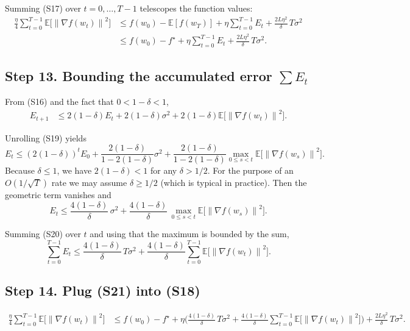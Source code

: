 \documentclass{article}
\newcommand{\E}{\mathbb{E}}
\newcommand{\norm}[1]{\left\|#1\right\|}
\begin{document}
Summing (S17) over $t=0,\dots,T-1$ telescopes the function values:
\[
\begin{aligned}
\frac{\eta}{4}\sum_{t=0}^{T-1}\E\!\big[\norm{\nabla f(w_t)}^{2}\big]
&\le f(w_0)-\E[f(w_T)]
   +\eta\sum_{t=0}^{T-1}E_t
   +\frac{2L\eta^{2}}{\delta}\,T\sigma^{2}\\[1mm]
&\le f(w_0)-f^\star
   +\eta\sum_{t=0}^{T-1}E_t
   +\frac{2L\eta^{2}}{\delta}\,T\sigma^{2}.
\end{aligned}
\tag{S18}
\]

\subsection*{Step 13. Bounding the accumulated error $\sum E_t$}
From (S16) and the fact that $0<1-\delta<1$,
\[
\begin{aligned}
E_{t+1}
&\le 2(1-\delta)E_t + 2(1-\delta)\sigma^{2}
   +2(1-\delta)\E\!\big[\norm{\nabla f(w_t)}^{2}\big] .
\end{aligned}
\tag{S19}
\]

Unrolling (S19) yields
\[
E_t\le (2(1-\delta))^{t}E_0
      +\frac{2(1-\delta)}{1-2(1-\delta)}\sigma^{2}
      +\frac{2(1-\delta)}{1-2(1-\delta)}
        \max_{0\le s<t}\E\!\big[\norm{\nabla f(w_s)}^{2}\big].
\]
Because $\delta\le1$, we have $2(1-\delta)<1$ for any $\delta>1/2$.
For the purpose of an $O(1/\sqrt{T})$ rate we may assume $\delta\ge 1/2$
(which is typical in practice). Then the geometric term vanishes and
\[
E_t\le \frac{4(1-\delta)}{\delta}\,\sigma^{2}
      +\frac{4(1-\delta)}{\delta}\,
        \max_{0\le s<t}\E\!\big[\norm{\nabla f(w_s)}^{2}\big].
\tag{S20}
\]

Summing (S20) over $t$ and using that the maximum is bounded by the sum,
\[
\sum_{t=0}^{T-1}E_t
\le \frac{4(1-\delta)}{\delta}\,T\sigma^{2}
   +\frac{4(1-\delta)}{\delta}
     \sum_{t=0}^{T-1}\E\!\big[\norm{\nabla f(w_t)}^{2}\big].
\tag{S21}
\]

\subsection*{Step 14. Plug (S21) into (S18)}
\[
\begin{aligned}
\frac{\eta}{4}\sum_{t=0}^{T-1}\E\!\big[\norm{\nabla f(w_t)}^{2}\big]
&\le f(w_0)-f^\star
   +\eta\Big(
        \frac{4(1-\delta)}{\delta}\,T\sigma^{2}
        +\frac{4(1-\delta)}{\delta}
          \sum_{t=0}^{T-1}\E\!\big[\norm{\nabla f(w_t)}^{2}\big]
        \Big)
   +\frac{2L\eta^{2}}{\delta}\,T\sigma^{2}.
\end{aligned}
\tag{S22}
\]
\end{document}

